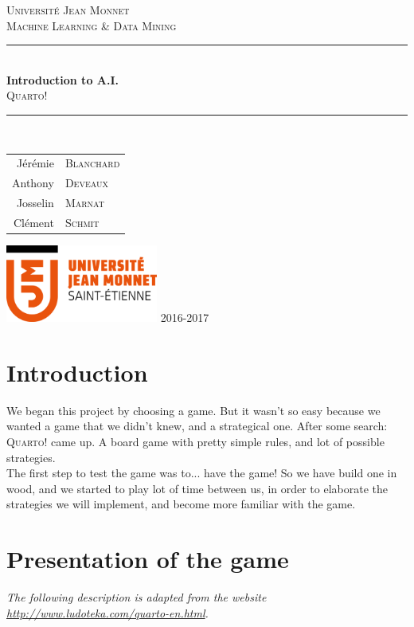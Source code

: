 \documentclass[a4paper,11pt]{article}
\newcommand{\HRule}{\rule{\linewidth}{0.5pt}}
\begin{document}
	\thispagestyle{empty}
	\vspace{2cm}
	\begin{center}
		\LARGE{\textsc{Université Jean Monnet}}\\[2cm]
		\Large{\textsc{Machine Learning \& Data Mining}} \\[2cm]
		\HRule \\[0.5cm]
		{ \huge \bfseries Introduction to A.I.}\\[0.4cm]
		\textsc{Quarto!}\\
		\HRule \\[1.5cm]
		\normalsize
		\begin{tabular}{r|l}
			Jérémie		& \textsc{Blanchard}\\
			Anthony		& \textsc{Deveaux}\\
			Josselin	& \textsc{Marnat}\\
			Clément		& \textsc{Schmit}	
		\end{tabular}
		\vfill
		\includegraphics[width=5cm]{include/logoUJM-2016.png}
		\vfill
		2016-2017
	\end{center}
	\newpage

	\renewcommand\contentsname{\begin{center}Table of Contents\end{center}}
	\tableofcontents

	\newpage
	\pagestyle{fancy}

	\section{Introduction}
		We began this project by choosing a game. But it wasn't so easy because we wanted a game that we didn't knew, and a strategical one. After some search: \textsc{Quarto!} came up. A board game with pretty simple rules, and lot of possible strategies. \\
		The first step to test the game was to... have the game! So we have build one in wood, and we started to play lot of time between us, in order to elaborate the strategies we will implement, and become more familiar with the game.

	\section{Presentation of the game}
		\textit{The following description is adapted from the website \href{http://www.ludoteka.com/quarto-en.html}{http://www.ludoteka.com/quarto-en.html}.}
\end{document}
